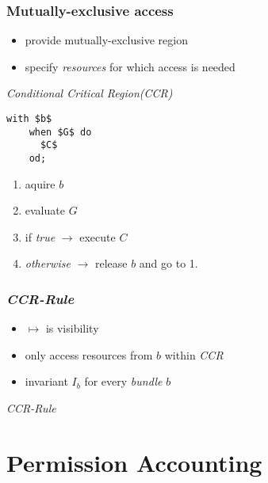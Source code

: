 \documentclass{beamer}
\begin{document}
	\begin{frame}[fragile]
	\frametitle{Mutually-exclusive access}
	\begin{itemize}
		\item provide mutually-exclusive region
		\item specify \emph{resources} for which access is needed
	\end{itemize}
	\begin{block}{\emph{Conditional Critical Region(CCR)}}
	\begin{minipage}{0.35\textwidth}
	\begin{lstlisting}[mathescape]
	with $b$
	when $G$ do
	  $C$
	od;
	\end{lstlisting}
	\end{minipage}\noindent
	\begin{minipage}{0.65\textwidth}
		\begin{enumerate}
			\item aquire $b$
			\item evaluate $G$
			\item if \textit{true} $\rightarrow$ execute $C$
			\item \textit{otherwise} $\rightarrow$ release $b$ and go to 1.
		\end{enumerate}
	\end{minipage}
	\end{block}
	\end{frame}

	\begin{frame}[fragile]
	\frametitle{\emph{CCR-Rule}}
	\begin{itemize}
		\item $\mapsto$ is visibility
		\item only access resources from $b$ within \emph{CCR}
		\item invariant $I_b$ for every \emph{bundle} $b$
	\end{itemize}
	\begin{block}{\emph{CCR-Rule}}
		\begin{prooftree}
		\end{prooftree}
	\end{block}
	\end{frame}

\section{Permission Accounting}
\end{document}
